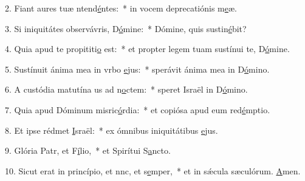 2. Fiant aures tuæ ntend\uline{é}ntes:~* in vocem deprecatiónis m\uline{e}æ.\par 
3. Si iniquitátes observávris, D\uline{ó}mine:~* Dómine, quis sustin\uline{é}bit?\par 
4. Quia apud te propititi\uline{o} est:~* et propter legem tuam sustínui te, D\uline{ó}mine.\par 
5. Sustínuit ánima mea in vrbo \uline{e}jus:~* sperávit ánima mea in D\uline{ó}mino.\par 
6. A custódia matutína us ad n\uline{o}ctem:~* speret Israël in D\uline{ó}mino.\par 
7. Quia apud Dóminum misric\uline{ó}rdia:~* et copiósa apud eum red\uline{é}mptio.\par 
8. Et ipse rédmet \uline{I}sraël:~* ex ómnibus iniquitátibus \uline{e}jus.\par 
9. Glória Patr, et F\uline{í}lio,~* et Spirítui S\uline{a}ncto.\par 
10. Sicut erat in princípio, et nnc, et s\uline{e}mper,~* et in sǽcula sæculórum. \uline{A}men.\par 
